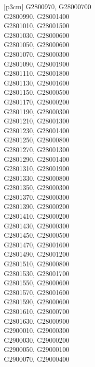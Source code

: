\begin{customLongTable}{ |p{3cm}| }
G2800970, G28000700 \\ \hline
G2800990, G28001400 \\ \hline
G2801010, G28001500 \\ \hline
G2801030, G28000600 \\ \hline
G2801050, G28000600 \\ \hline
G2801070, G28000300 \\ \hline
G2801090, G28001900 \\ \hline
G2801110, G28001800 \\ \hline
G2801130, G28001600 \\ \hline
G2801150, G28000500 \\ \hline
G2801170, G28000200 \\ \hline
G2801190, G28000300 \\ \hline
G2801210, G28001300 \\ \hline
G2801230, G28001400 \\ \hline
G2801250, G28000800 \\ \hline
G2801270, G28001300 \\ \hline
G2801290, G28001400 \\ \hline
G2801310, G28001900 \\ \hline
G2801330, G28000800 \\ \hline
G2801350, G28000300 \\ \hline
G2801370, G28000300 \\ \hline
G2801390, G28000200 \\ \hline
G2801410, G28000200 \\ \hline
G2801430, G28000300 \\ \hline
G2801450, G28000500 \\ \hline
G2801470, G28001600 \\ \hline
G2801490, G28001200 \\ \hline
G2801510, G28000800 \\ \hline
G2801530, G28001700 \\ \hline
G2801550, G28000600 \\ \hline
G2801570, G28001600 \\ \hline
G2801590, G28000600 \\ \hline
G2801610, G28000700 \\ \hline
G2801630, G28000900 \\ \hline
G2900010, G29000300 \\ \hline
G2900030, G29000200 \\ \hline
G2900050, G29000100 \\ \hline
G2900070, G29000400 \\ \hline

\end{customLongTable}
